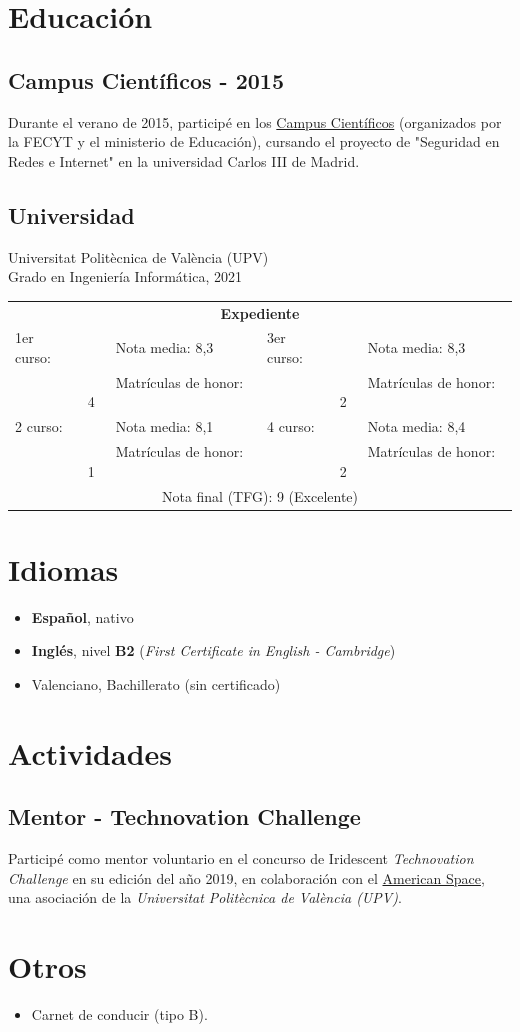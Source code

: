 \documentclass[letterpaper, 12pt, dvipsnames]{article}
\newcommand{\uni}{Universitat Politècnica de València (UPV)}
\newcommand{\fce}{\emph{First Certificate in English - Cambridge}}
\newcommand{\grade}[1]{Nota media: #1}
\newcommand{\mh}[1]{Matrículas de honor: #1}
\newcommand{\tabitem}{~~\llap{\textbullet}~~}
\newcommand{\unigrades}[9]{
    \begin{tabular}{|ll<{\hspace{1em}}|>{\hspace{1em}}ll|}
        \hline
        \multicolumn{4}{|c|}{\textbf{Expediente}}\\[.5em]
        1er curso: & \tabitem \grade{#1} & 3er curso: & \tabitem \grade{#5} \\
        & \tabitem \mh{#2} && \tabitem \mh{#6} \\
        2{\textdegree} curso: & \tabitem \grade{#3} & 4{\textdegree} curso: & \tabitem \grade{#7} \\
        & \tabitem \mh{#4} && \tabitem \mh{#8} \\
        \multicolumn{4}{|c|}{\rule{0pt}{1.5em}Nota final (TFG): #9}\\
        \hline
    \end{tabular}
}
\newcommand{\myunigrades}{
    \unigrades
    {8,3}
    {4}
    {8,1}
    {1}
    {8,3}
    {2}
    {8,4}
    {2}
    {9 (Excelente)}
}
\begin{document}
    \pagebreak

    \section{Educación}

    \subsection{Campus Científicos - 2015}

    Durante el verano de 2015, participé en los \href{https://www.campuscientificos.es/}{Campus Científicos} (organizados por la FECYT y el ministerio de Educación), cursando el proyecto de "Seguridad en Redes e Internet" en la universidad Carlos III de Madrid.

    \subsection{Universidad}

    {\uni}\\
    Grado en Ingeniería Informática, 2021\\

    \myunigrades

    \section{Idiomas}

    \begin{itemize}
        \item \textbf{Español}, nativo
        \item \textbf{Inglés}, nivel \textbf{B2} (\fce)
        \item Valenciano, Bachillerato (sin certificado)
    \end{itemize}

    \section{Actividades}

    \subsection{Mentor - Technovation Challenge}

    Participé como mentor voluntario en el concurso de Iridescent \emph{Technovation Challenge} en su edición del año 2019, en colaboración con el \href{https://cdl.upv.es/american-space}{American Space}, una asociación de la \emph{\uni}.

    \section{Otros}

    \begin{itemize}
        \item Carnet de conducir (tipo B).
    \end{itemize}
\end{document}

